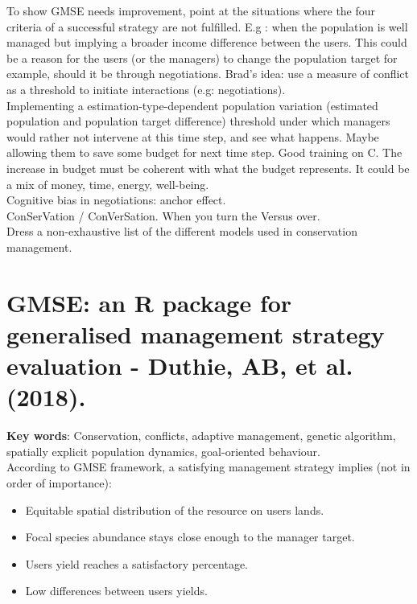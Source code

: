 \documentclass[12pt]{article}
\begin{document}
To show GMSE needs improvement, point at the situations where the four criteria of a successful strategy are not fulfilled. E.g : when the population is well managed but implying a broader income difference between the users. This could be a reason for the users (or the managers) to change the population target for example, should it be through negotiations.
Brad's idea: use a measure of conflict as a threshold to initiate interactions (e.g: negotiations).\\
Implementing a estimation-type-dependent population variation (estimated population and population target difference) threshold under which managers would rather not intervene at this time step, and see what happens.
Maybe allowing them to save some budget for next time step.
Good training on C. The increase in budget must be coherent with what the budget represents.
It could be a mix of money, time, energy, well-being.\\
Cognitive bias in negotiations: anchor effect.\\
ConSerVation / ConVerSation. When you turn the Versus over.\\
Dress a non-exhaustive list of the different models used in conservation management.


\section*{GMSE:  an  R  package  for generalised  management  strategy  evaluation - Duthie,  AB,  et al.  (2018).}

\textbf{Key words}: Conservation, conflicts, adaptive management, genetic algorithm, spatially explicit population dynamics, goal-oriented behaviour.\\

According to GMSE framework, a satisfying management strategy implies (not in order of importance):
\begin{itemize}
    \item Equitable spatial distribution of the resource on users lands.
    \item Focal species abundance stays close enough to the manager target.
    \item Users yield reaches a satisfactory percentage.
    \item Low differences between users yields.
\end{itemize}
\end{document}
